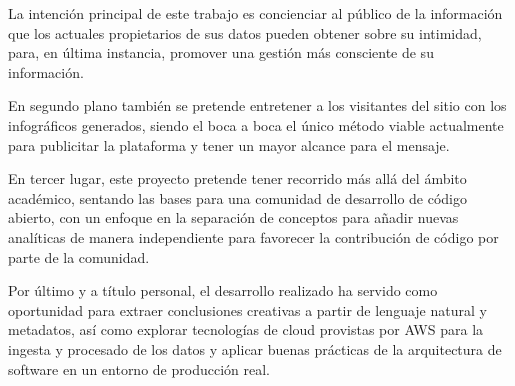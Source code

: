
La intención principal de este trabajo es concienciar al público de la información que los actuales propietarios de sus datos pueden obtener sobre su intimidad, para, en última instancia, promover una gestión más consciente de su información. 

En segundo plano también se pretende entretener a los visitantes del sitio con los infográficos generados, siendo el boca a boca el único método viable actualmente para publicitar la plataforma y tener un mayor alcance para el mensaje.

En tercer lugar, este proyecto pretende tener recorrido más allá del ámbito académico, sentando las bases para una comunidad de desarrollo de código abierto, con un enfoque en la separación de conceptos\cite{SeparationOfConcerns} para añadir nuevas analíticas de manera independiente para favorecer la contribución de código por parte de la comunidad.

Por último y a título personal, el desarrollo realizado ha servido como oportunidad para extraer conclusiones creativas a partir de lenguaje natural y metadatos, así como explorar tecnologías de cloud provistas por AWS para la ingesta y procesado de los datos y aplicar buenas prácticas de la arquitectura de software en un entorno de producción real.
